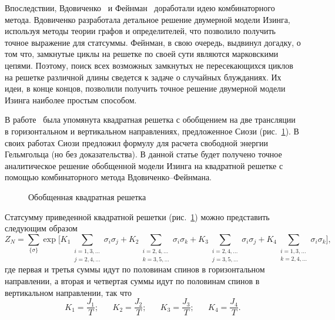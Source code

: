 \documentclass[utf8,12pt]{jetp}
\begin{document}
Впоследствии, Вдовиченко~\cite{vdovichenko1964, vdovichenko1965} и Фейнман~\cite{feynman1972} доработали идею комбинаторного метода. Вдовиченко разработала детальное решение двумерной модели Изинга, используя методы теории графов и определителей, что позволило получить точное выражение для статсуммы. Фейнман, в свою очередь, выдвинул догадку, о том что, замкнутые циклы на решетке по своей сути являются марковскими цепями. Поэтому, поиск всех возможных замкнутых не пересекающихся циклов на решетке различной длины сведется к задаче о случайных блужданиях. Их идеи, в конце концов, позволили получить точное решение двумерной модели Изинга наиболее простым способом.

В работе~\cite{generalizedIsing2021} была упомянута квадратная решетка с обобщением на две трансляции в горизонтальном и вертикальном направлениях, предложенное Сиози (рис.~\ref{gen}). В своих работах Сиози \cite{syozi1972} предложил формулу для расчета свободной энергии Гельмгольца (но без доказательства). В данной статье будет получено точное аналитическое решение обобщенной модели Изинга на квадратной решетке с помощью комбинаторного метода Вдовиченко--Фейнмана.

\begin{figure}[h]
	\caption{Обобщенная квадратная решетка}
	\label{gen}
\end{figure}

Статсумму приведенной квадратной решетки (рис.~\ref{gen}) можно представить следующим образом 
\begin{equation}
Z_{N} = \sum_{\{\sigma\}} \exp{\bigg[ K_1 \sum_{\substack{i = 1,3,\dots \\ j = 2,4,\dots}} \sigma_i \sigma_j + K_2 \sum_{\substack{i = 2,4,\dots \\ k = 3,5,\dots}} \sigma_i \sigma_k + K_3 \sum_{\substack{i = 2,4,\dots \\ j = 3,5,\dots}} \sigma_i \sigma_j + K_4 \sum_{\substack{i = 1,3,\dots \\ k = 2,4,\dots}} \sigma_i \sigma_k\bigg]},
\end{equation}
где первая и третья суммы идут по половинам спинов в горизонтальном направлении,  а вторая и четвертая суммы идут по половинам спинов в вертикальном направлении, так что
\begin{equation*}
K_1 = \frac{J_1}{T}; \;\;\;\;\;\; K_2 = \frac{J_2}{T};\;\;\;\;\;\; K_3 = \frac{J_3}{T};\;\;\;\;\;\;K_4 = \frac{J_4}{T}.
\end{equation*}
\end{document}
